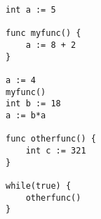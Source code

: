 \begin{lstlisting}[caption={Program structure where global scope work as main}]
int a := 5

func myfunc() {
	a := 8 + 2
}

a := 4
myfunc()
int b := 18
a := b*a

func otherfunc() {
	int c := 321
}

while(true) {
	otherfunc()
}
\end{lstlisting}